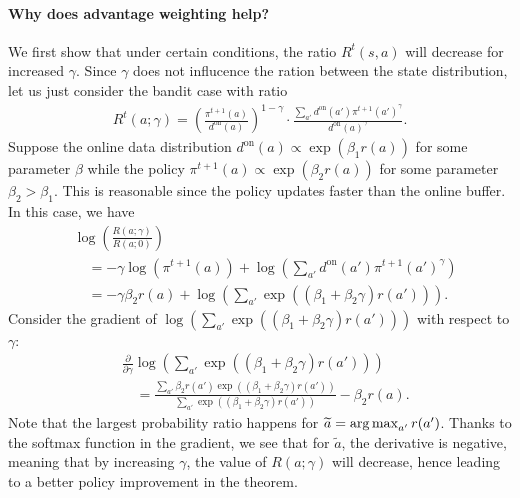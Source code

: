 \paragraph{Why does advantage weighting help?}
We first show that under certain conditions, the ratio $R^t(s, a)$ will decrease for increased $\gamma$. Since $\gamma$ does not influcence the ration between the state distribution, let us just consider the bandit case with ratio 
\begin{align*}
    R^t(a;\gamma) = \left(\frac{{\pi^{t+1}}(a)}{d^{\text{on}}(a)}\right)^{1-\gamma}  \cdot \frac{\sum_{a'}d^{\text{on}}(a') \pi^{t+1}(a')^\gamma}{d^{\text{on}}(a)^\gamma}.
\end{align*}
Suppose the online data distribution $d^{\text{on}}(a)\propto \exp(\beta_1 r(a))$ for some parameter $\beta$ while the policy $\pi^{t+1}(a) \propto \exp(\beta_2 r(a))$ for some parameter $\beta_2 > \beta_1$. This is reasonable since the policy updates faster than the online buffer.
In this case, we have 
\begin{align*}
    &\log \left(\frac{R(a;\gamma)}{R(a;0)}\right) \\
    &\quad= -\gamma \log(\pi^{t+1}(a)) + \log \left(\sum_{a'}d^{\text{on}}(a') \pi^{t+1}(a')^\gamma \right) \\
    &\quad = -\gamma \beta_2 r(a) + \log \left(\sum_{a'}\exp((\beta_1 + \beta_2 \gamma) r(a')) \right).
\end{align*}
Consider the gradient of $\log \left(\sum_{a'}\exp((\beta_1 + \beta_2 \gamma) r(a')) \right)$ with respect to $\gamma$:
\begin{align*}
    &\frac{\partial}{\partial \gamma} \log \left(\sum_{a'}\exp((\beta_1 + \beta_2 \gamma) r(a')) \right)\\ 
    &\quad = \frac{\sum_{a'} \beta_2 r(a') \exp((\beta_1 + \beta_2 \gamma) r(a'))}{\sum_{a'}\exp((\beta_1 + \beta_2 \gamma) r(a'))} - \beta_2 r(a).
\end{align*}
Note that the largest probability ratio happens for $\widetilde a = \mathop{\rm arg\,max}_{a'} r(a')$. Thanks to the softmax function in the gradient, we see that for $\tilde a$, the derivative is negative, meaning that by increasing $\gamma$, the value of $R(a;\gamma)$ will decrease, hence leading to a better policy improvement in the theorem.





















